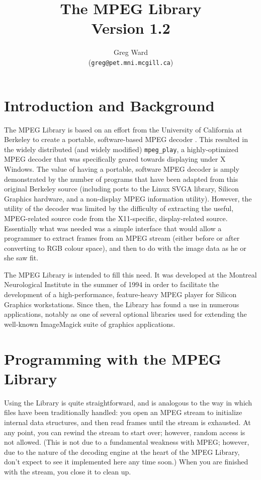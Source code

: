 \documentclass[11pt]{article}
\title{The MPEG Library\\
       Version 1.2}
\author{Greg Ward\\({\tt greg@pet.mni.mcgill.ca})}
\newcommand{\code}[1]{\texttt{#1}}
\begin{document}
\maketitle

\section{Introduction and Background}

The MPEG Library is based on an effort from the University of
California at Berkeley to create a portable, software-based MPEG
decoder  \cite{Patel93}.  This resulted in the widely distributed (and
widely modified) \code{mpeg\_play}, a highly-optimized MPEG decoder
that was specifically geared towards displaying under X Windows.  The
value of having a portable, software MPEG decoder is amply
demonstrated by the number of programs that have been adapted from
this original Berkeley source (including ports to the Linux SVGA
library, Silicon Graphics hardware, and a non-display MPEG information
utility).  However, the utility of the decoder was limited by the
difficulty of extracting the useful, MPEG-related source code from the
X11-specific, display-related source.  Essentially what was needed was
a simple interface that would allow a programmer to extract frames
from an MPEG stream (either before or after converting to RGB colour
space), and then to do with the image data as he or she saw fit.

The MPEG Library is intended to fill this need.  It was developed at
the Montreal Neurological Institute in the summer of 1994 in order to
facilitate the development of a high-performance, feature-heavy
MPEG player for Silicon Graphics workstations.  Since then, the
Library has found a use in numerous applications, notably as one of
several optional libraries used for extending the well-known
ImageMagick suite of graphics applications.

\section{Programming with the MPEG Library}

Using the Library is quite straightforward, and is analogous to the
way in which files have been traditionally handled: you open an MPEG
stream to initialize internal data structures, and then read frames
until the stream is exhausted.  At any point, you can rewind the
stream to start over; however, random access is not allowed.  (This is
not due to a fundamental weakness with MPEG; however, due to the
nature of the decoding engine at the heart of the MPEG Library, don't
expect to see it implemented here any time soon.)  When you are
finished with the stream, you close it to clean up.
\end{document}
